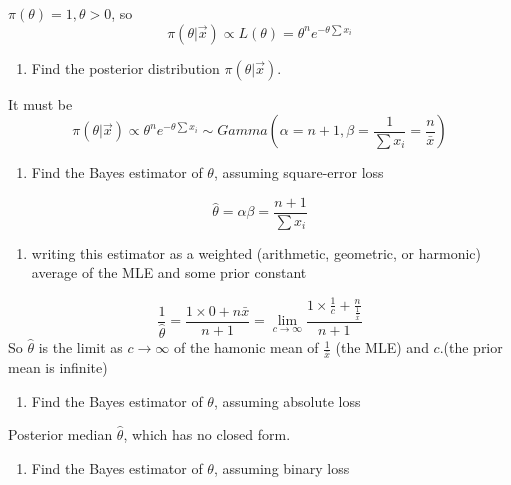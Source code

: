 \documentclass[]{article}
\providecommand{\tightlist}{%
  \setlength{\itemsep}{0pt}\setlength{\parskip}{0pt}}
\begin{document}
\(\pi(\theta)=1,\theta>0\), so
\[\pi(\theta|\vec x)\propto L(\theta)=\theta^n e^{-\theta\sum x_i}\]

\begin{enumerate}
\def\labelenumi{\alph{enumi}.}
\tightlist
\item
  \textcolor[rgb]{0.5,0.5,0.5}{Find the posterior distribution $\pi(\theta|\vec x)$.}
\end{enumerate}

It must be
\[\pi(\theta|\vec x)\propto \theta^n e^{-\theta\sum x_i}\sim Gamma(\alpha=n+1,\beta=\frac1{\sum x_i}=\frac{n}{\bar x})\]

\begin{enumerate}
\def\labelenumi{\alph{enumi}.}
\setcounter{enumi}{1}
\tightlist
\item
  \textcolor[rgb]{0.5,0.5,0.5}{Find the Bayes estimator of $\theta$, assuming square-error loss}
\end{enumerate}

\[\hat\theta=\alpha\beta=\frac{n+1}{\sum x_i}\]

\begin{enumerate}
\def\labelenumi{\alph{enumi}.}
\setcounter{enumi}{2}
\tightlist
\item
  \textcolor[rgb]{0.5,0.5,0.5}{writing this estimator as a weighted (arithmetic, geometric, or harmonic) average of the MLE and some prior constant}
\end{enumerate}

\[\frac1{\hat\theta}=\frac{1\times0+n\bar x}{n+1}=\lim_{c\to\infty}\frac{1\times\frac1c+\frac{n}{\frac1{\bar x}}}{n+1}\]
So \(\hat\theta\) is the limit as \(c\to\infty\) of the hamonic mean of
\(\frac1{\bar x}\) (the MLE) and \(c\).(the prior mean is infinite)

\begin{enumerate}
\def\labelenumi{\alph{enumi}.}
\setcounter{enumi}{3}
\tightlist
\item
  \textcolor[rgb]{0.5,0.5,0.5}{Find the Bayes estimator of $\theta$, assuming absolute loss}
\end{enumerate}

Posterior median \(\hat\theta\), which has no closed form.

\begin{enumerate}
\def\labelenumi{\alph{enumi}.}
\setcounter{enumi}{4}
\tightlist
\item
  \textcolor[rgb]{0.5,0.5,0.5}{Find the Bayes estimator of $\theta$, assuming binary loss}
\end{enumerate}
\end{document}
